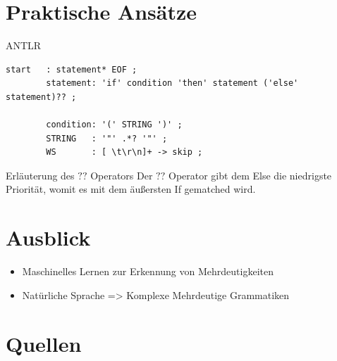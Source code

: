 \documentclass[t]{beamer}
\begin{document}
    \section{Praktische Ansätze}\label{sec:praktische-ansatze}
    \begin{frame}[fragile]
        \begin{block}{ANTLR}
	        \hspace*{-3.5em}
            \begin{minipage}{\textwidth+3.5em}
                \begin{lstlisting}[style=antlr,label={lst:lstlisting3}]
        start   : statement* EOF ;
        statement: 'if' condition 'then' statement ('else' statement)?? ;

        condition: '(' STRING ')' ;
        STRING   : '"' .*? '"' ;
        WS       : [ \t\r\n]+ -> skip ;
                \end{lstlisting}
            \end{minipage}
        \end{block}
        \vspace{1em}
        \begin{exampleblock}{Erläuterung des \(??\) Operators}
            Der \(??\) Operator gibt dem Else die niedrigste Priorität, womit es mit dem äußersten If gematched wird. \\
        \end{exampleblock}\cite{parr}
    \end{frame}


    \section{Ausblick}\label{sec:ausblick-und-zukunftige-projekte}
    \begin{frame}
        \begin{itemize}
            \item Maschinelles Lernen zur Erkennung von Mehrdeutigkeiten
            \item Natürliche Sprache => Komplexe Mehrdeutige Grammatiken
        \end{itemize}
    \end{frame}


    \section{Quellen}\label{sec:quellen}
    \begin{frame}[allowframebreaks]
        
        
    \end{frame}
\end{document}
